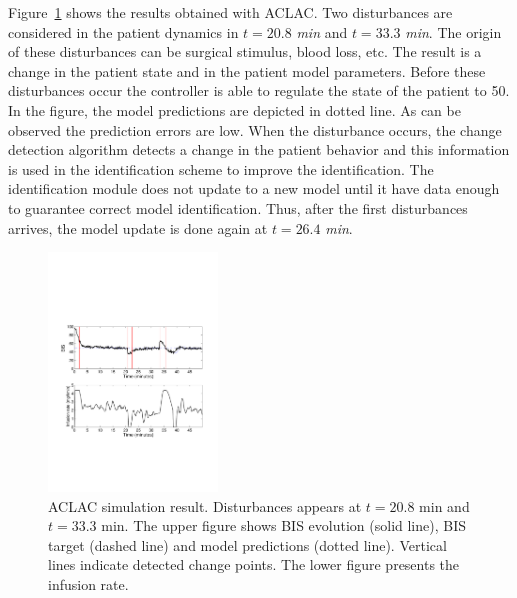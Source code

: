 Figure~\ref{fig:fig2ColsedLoopContrlSim} shows the results obtained with ACLAC.
Two disturbances are considered in the patient
dynamics in $t = 20.8$ \emph{min} and $t = 33.3$ \emph{min}. The origin of these disturbances
can be surgical stimulus, blood loss, etc. The result is a change in
the patient state and in the patient model parameters.
Before these disturbances occur the controller is able to regulate the state of the patient to 50.
%
In the figure, the model predictions are
depicted in dotted line. As can be observed the prediction errors are low.
When the disturbance occurs, the change detection algorithm detects a
change in the patient behavior and this information is used in the identification scheme to improve the identification.
%
The identification module does not update to a new model until it have data enough to guarantee correct model identification.
%
Thus, after the first disturbances arrives, the model update is done again at $t = 26.4$ \emph{min}.
\begin{figure}[htb!]
\centering
\includegraphics[width=0.40\textwidth]{./pics/aclac_paper/fig2ColsedLoopContrlSim.pdf}%
\caption{ACLAC simulation result. Disturbances appears at $t = 20.8$ min and $t = 33.3$ min. The upper figure shows BIS evolution (solid line), BIS target (dashed line) and model predictions (dotted line). Vertical lines indicate detected change points. The lower figure presents the infusion rate.}
\label{fig:fig2ColsedLoopContrlSim}
\end{figure}

